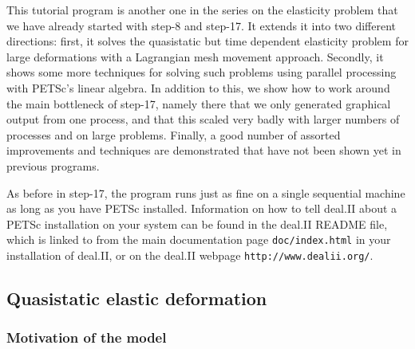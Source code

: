 \documentclass{article}
\begin{document}
This tutorial program is another one in the series on the elasticity problem
that we have already started with step-8 and step-17. It extends it into two
different directions: first, it solves the quasistatic but time dependent
elasticity problem for large deformations with a Lagrangian mesh movement
approach. Secondly, it shows some more techniques for solving such problems
using parallel processing with PETSc's linear algebra. In addition to this, we
show how to work around the main bottleneck of step-17, namely there that we
only generated graphical output from one process, and that this scaled very
badly with larger numbers of processes and on large problems. Finally, a good
number of assorted improvements and techniques are demonstrated that have not
been shown yet in previous programs.

As before in step-17, the program runs just as fine on a single sequential
machine as long as you have PETSc installed. Information on how to tell
deal.II about a PETSc installation on your system can be found in the deal.II
README file, which is linked to from the main documentation page
\texttt{doc/index.html} in your installation of deal.II, or on the deal.II
webpage \texttt{http://www.dealii.org/}.


\subsection*{Quasistatic elastic deformation}

\subsubsection*{Motivation of the model}
\end{document}
